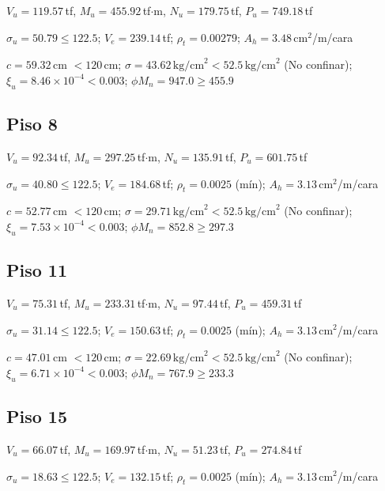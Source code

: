 $V_u=119.57$\,tf,\; $M_u=455.92$\,tf$\cdot$m,\;
$N_u=179.75$\,tf,\; $P_u=749.18$\,tf

$\sigma_u=50.79\leq122.5$;\quad
$V_e=239.14$\,tf;\;
$\rho_t=0.00279$;\;
$A_h=3.48$\,cm$^2$/m/cara

$c=59.32$\,cm $<120$\,cm;\quad
$\sigma=43.62\,\text{kg/cm}^2<52.5\,\text{kg/cm}^2$
(No confinar);\quad
$\xi_u=8.46\times10^{-4}<0.003$;\quad
$\phi M_n=947.0\geq455.9$

\subsection{Piso 8}

$V_u=92.34$\,tf,\; $M_u=297.25$\,tf$\cdot$m,\;
$N_u=135.91$\,tf,\; $P_u=601.75$\,tf

$\sigma_u=40.80\leq122.5$;\quad
$V_e=184.68$\,tf;\;
$\rho_t=0.0025$ (mín);\;
$A_h=3.13$\,cm$^2$/m/cara

$c=52.77$\,cm $<120$\,cm;\quad
$\sigma=29.71\,\text{kg/cm}^2<52.5\,\text{kg/cm}^2$
(No confinar);\quad
$\xi_u=7.53\times10^{-4}<0.003$;\quad
$\phi M_n=852.8\geq297.3$

\subsection{Piso 11}

$V_u=75.31$\,tf,\; $M_u=233.31$\,tf$\cdot$m,\;
$N_u=97.44$\,tf,\; $P_u=459.31$\,tf

$\sigma_u=31.14\leq122.5$;\quad
$V_e=150.63$\,tf;\;
$\rho_t=0.0025$ (mín);\;
$A_h=3.13$\,cm$^2$/m/cara

$c=47.01$\,cm $<120$\,cm;\quad
$\sigma=22.69\,\text{kg/cm}^2<52.5\,\text{kg/cm}^2$
(No confinar);\quad
$\xi_u=6.71\times10^{-4}<0.003$;\quad
$\phi M_n=767.9\geq233.3$

\subsection{Piso 15}

$V_u=66.07$\,tf,\; $M_u=169.97$\,tf$\cdot$m,\;
$N_u=51.23$\,tf,\; $P_u=274.84$\,tf

$\sigma_u=18.63\leq122.5$;\quad
$V_e=132.15$\,tf;\;
$\rho_t=0.0025$ (mín);\;
$A_h=3.13$\,cm$^2$/m/cara

